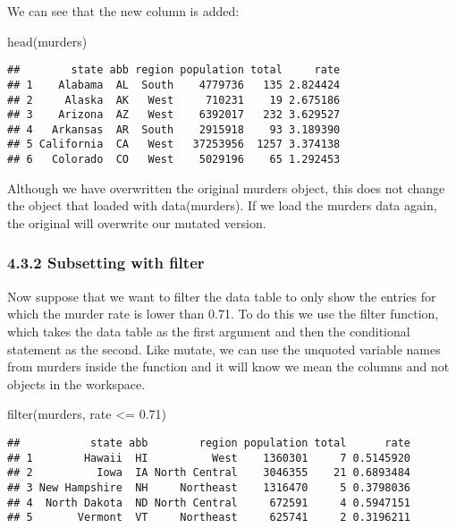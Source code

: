 \documentclass[
]{article}
\newenvironment{Shaded}{\begin{snugshade}}{\end{snugshade}}
\newcommand{\FloatTok}[1]{\textcolor[rgb]{0.00,0.00,0.81}{#1}}
\newcommand{\FunctionTok}[1]{\textcolor[rgb]{0.00,0.00,0.00}{#1}}
\newcommand{\NormalTok}[1]{#1}
\newcommand{\SpecialCharTok}[1]{\textcolor[rgb]{0.00,0.00,0.00}{#1}}
\begin{document}
We can see that the new column is added:

\begin{Shaded}
\begin{Highlighting}[]
\FunctionTok{head}\NormalTok{(murders)}
\end{Highlighting}
\end{Shaded}

\begin{verbatim}
##        state abb region population total     rate
## 1    Alabama  AL  South    4779736   135 2.824424
## 2     Alaska  AK   West     710231    19 2.675186
## 3    Arizona  AZ   West    6392017   232 3.629527
## 4   Arkansas  AR  South    2915918    93 3.189390
## 5 California  CA   West   37253956  1257 3.374138
## 6   Colorado  CO   West    5029196    65 1.292453
\end{verbatim}

Although we have overwritten the original murders object, this does not
change the object that loaded with data(murders). If we load the murders
data again, the original will overwrite our mutated version.

\hypertarget{subsetting-with-filter}{%
\subsubsection{4.3.2 Subsetting with
filter}\label{subsetting-with-filter}}

Now suppose that we want to filter the data table to only show the
entries for which the murder rate is lower than 0.71. To do this we use
the filter function, which takes the data table as the first argument
and then the conditional statement as the second. Like mutate, we can
use the unquoted variable names from murders inside the function and it
will know we mean the columns and not objects in the workspace.

\begin{Shaded}
\begin{Highlighting}[]
\FunctionTok{filter}\NormalTok{(murders, rate }\SpecialCharTok{\textless{}=} \FloatTok{0.71}\NormalTok{)}
\end{Highlighting}
\end{Shaded}

\begin{verbatim}
##           state abb        region population total      rate
## 1        Hawaii  HI          West    1360301     7 0.5145920
## 2          Iowa  IA North Central    3046355    21 0.6893484
## 3 New Hampshire  NH     Northeast    1316470     5 0.3798036
## 4  North Dakota  ND North Central     672591     4 0.5947151
## 5       Vermont  VT     Northeast     625741     2 0.3196211
\end{verbatim}
\end{document}
